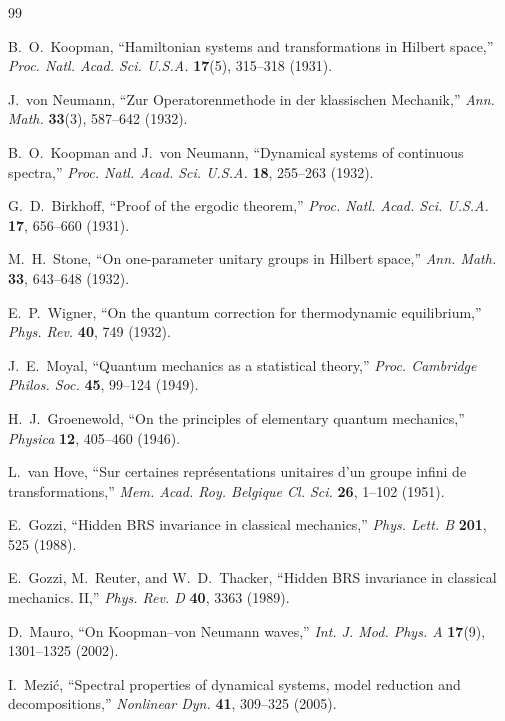 \documentclass[11pt]{article}
\theoremstyle{remark}
\begin{document}
\begin{thebibliography}{99}

 B.~O.~Koopman, ``Hamiltonian systems and transformations in Hilbert space,'' \emph{Proc. Natl. Acad. Sci. U.S.A.} \textbf{17}(5), 315--318 (1931).

 J.~von Neumann, ``Zur Operatorenmethode in der klassischen Mechanik,'' \emph{Ann. Math.} \textbf{33}(3), 587--642 (1932).

 B.~O.~Koopman and J.~von Neumann, ``Dynamical systems of continuous spectra,'' \emph{Proc. Natl. Acad. Sci. U.S.A.} \textbf{18}, 255--263 (1932).

 G.~D.~Birkhoff, ``Proof of the ergodic theorem,'' \emph{Proc. Natl. Acad. Sci. U.S.A.} \textbf{17}, 656--660 (1931).

 M.~H.~Stone, ``On one-parameter unitary groups in Hilbert space,'' \emph{Ann. Math.} \textbf{33}, 643--648 (1932).

 E.~P.~Wigner, ``On the quantum correction for thermodynamic equilibrium,'' \emph{Phys. Rev.} \textbf{40}, 749 (1932).

 J.~E.~Moyal, ``Quantum mechanics as a statistical theory,'' \emph{Proc. Cambridge Philos. Soc.} \textbf{45}, 99--124 (1949).

 H.~J.~Groenewold, ``On the principles of elementary quantum mechanics,'' \emph{Physica} \textbf{12}, 405--460 (1946).

 L.~van Hove, ``Sur certaines repr\'esentations unitaires d'un groupe infini de transformations,'' \emph{Mem. Acad. Roy. Belgique Cl. Sci.} \textbf{26}, 1--102 (1951).

 E.~Gozzi, ``Hidden BRS invariance in classical mechanics,'' \emph{Phys. Lett. B} \textbf{201}, 525 (1988).

 E.~Gozzi, M.~Reuter, and W.~D.~Thacker, ``Hidden BRS invariance in classical mechanics. II,'' \emph{Phys. Rev. D} \textbf{40}, 3363 (1989).

 D.~Mauro, ``On Koopman--von Neumann waves,'' \emph{Int. J. Mod. Phys. A} \textbf{17}(9), 1301--1325 (2002).

 I.~Mezi\'c, ``Spectral properties of dynamical systems, model reduction and decompositions,'' \emph{Nonlinear Dyn.} \textbf{41}, 309--325 (2005).


\end{thebibliography}
\end{document}
